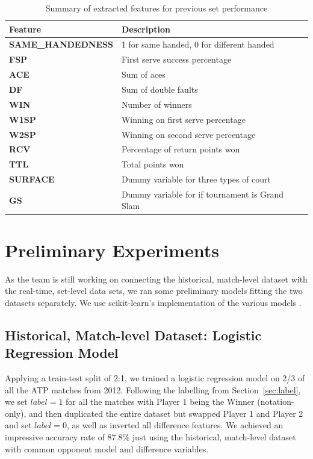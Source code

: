 \documentclass[paper=a4, fontsize=11pt]{scrartcl} %
\numberwithin{equation}{section} %
\numberwithin{figure}{section} %
\numberwithin{table}{section} %
\begin{document}
\begin{center}
\begin{table}[h]
    \begin{tabular}{  l | p{10cm} }
    \hline
    Feature  & Description \\ \hline
    \textbf{SAME\_HANDEDNESS}  & 1 for same handed, 0 for different handed \\ \hline
    \textbf{FSP}  & First serve success percentage \\ \hline
    \textbf{ACE}  & Sum of aces \\ \hline
    \textbf{DF}  & Sum of double faults \\ \hline
    \textbf{WIN}  & Number of winners \\ \hline
    \textbf{W1SP}  & Winning on first serve percentage \\ \hline
    \textbf{W2SP}  & Winning on second serve percentage \\ \hline
    \textbf{RCV}  & Percentage of return points won \\ \hline
    \textbf{TTL}  & Total points won \\ \hline
    \textbf{SURFACE}  & Dummy variable for three types of court\\ \hline
    \textbf{GS} & Dummy variable for if tournament is Grand Slam \\ \hline    
    \end{tabular}
    \caption{Summary of extracted features for previous set performance}
    \label{tab:features}
    \end{table}
\end{center}



\section{Preliminary Experiments}
As the team is still working on connecting the historical, match-level dataset with the real-time, set-level data sets, we ran some preliminary models fitting the two datasets separately. We use scikit-learn's implementation of the various models \cite{scikit-learn}.
\subsection{Historical, Match-level Dataset: Logistic Regression Model}
Applying a train-test split of 2:1, we trained a logistic regression model on 2/3 of all the ATP matches from 2012. Following the labelling from Section~\ref{sec:label}, we set $label = 1$ for all the matches with Player 1 being the Winner (notation-only), and then duplicated the entire dataset but swapped Player 1 and Player 2 and set $label = 0$, as well as inverted all difference features.
We achieved an impressive accuracy rate of 87.8\% just using the historical, match-level dataset with common opponent model and difference variables. 
\end{document}
